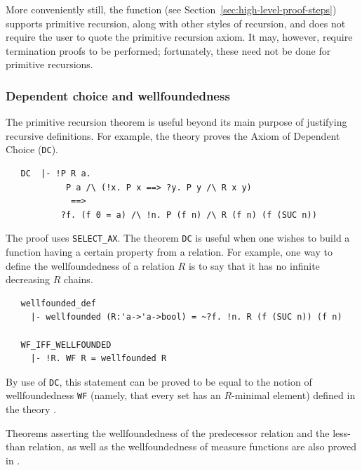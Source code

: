 More conveniently still, the  function (see
Section~\ref{sec:high-level-proof-steps}) supports primitive
recursion, along with other styles of recursion, and does not require
the user to quote the primitive recursion axiom. It may, however,
require termination proofs to be performed; fortunately, these need
not be done for primitive recursions.

\subsubsection{Dependent choice and wellfoundedness}
\label{prim-rec-conseq}

The primitive recursion theorem is useful beyond its main purpose of
justifying recursive definitions. For example, the theory
 proves the Axiom of Dependent Choice ({\small\verb+DC+}).

\begin{hol}
\begin{verbatim}
   DC  |- !P R a.
            P a /\ (!x. P x ==> ?y. P y /\ R x y)
             ==>
           ?f. (f 0 = a) /\ !n. P (f n) /\ R (f n) (f (SUC n))
\end{verbatim}
\end{hol}

The proof uses {\small\verb+SELECT_AX+}. The theorem {\small\verb+DC+}
is useful when one wishes to build a function having a certain
property from a relation. For example, one way to define the
wellfoundedness of a relation $R$ is to say that it has no infinite
decreasing $R$ chains.
%
\begin{hol}
\begin{verbatim}
   wellfounded_def
     |- wellfounded (R:'a->'a->bool) = ~?f. !n. R (f (SUC n)) (f n)

   WF_IFF_WELLFOUNDED
     |- !R. WF R = wellfounded R
\end{verbatim}
\end{hol}
By use of {\small\verb+DC+}, this statement can be proved
to be equal to the notion of wellfoundedness {\small\verb+WF+}
(namely, that every set has an $R$-minimal element) defined in the theory
.

Theorems asserting the wellfoundedness of the predecessor relation and
the less-than relation, as well as the wellfoundedness of measure
functions are also proved in .

